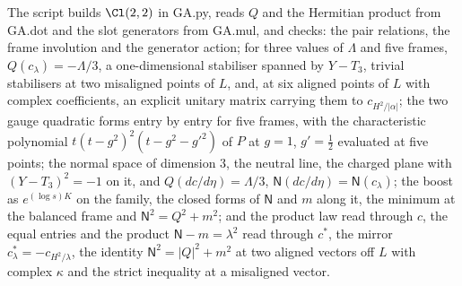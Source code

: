 The script builds $\Cl(2,2)$ in GA.py, reads $Q$ and the Hermitian product from GA.dot and the slot generators from GA.mul, and checks: the pair relations, the frame involution and the generator action; for three values of $\Lambda$ and five frames, $Q(c_{\lambda}) = -\Lambda/3$, a one-dimensional stabiliser spanned by $Y - T_{3}$, trivial stabilisers at two misaligned points of $L$, and, at six aligned points of $L$ with complex coefficients, an explicit unitary matrix carrying them to $c_{H^{2}/|\alpha|}$; the two gauge quadratic forms entry by entry for five frames, with the characteristic polynomial $t(t - g^{2})^{2}(t - g^{2} - g'^{2})$ of $P$ at $g = 1$, $g' = \tfrac12$ evaluated at five points; the normal space of dimension $3$, the neutral line, the charged plane with $(Y - T_{3})^{2} = -1$ on it, and $Q(dc/d\eta) = \Lambda/3$, $\mathsf{N}(dc/d\eta) = \mathsf{N}(c_{\lambda})$; the boost as $e^{(\log s)K}$ on the family, the closed forms of $\mathsf{N}$ and $m$ along it, the minimum at the balanced frame and $\mathsf{N}^{2} = Q^{2} + m^{2}$; and the product law read through $c$, the equal entries and the product $\mathsf{N} - m = \lambda^{2}$ read through $c^{*}$, the mirror $c_{\lambda}^{*} = -c_{H^{2}/\lambda}$, the identity $\mathsf{N}^{2} = |Q|^{2} + m^{2}$ at two aligned vectors off $L$ with complex $\kappa$ and the strict inequality at a misaligned vector.

